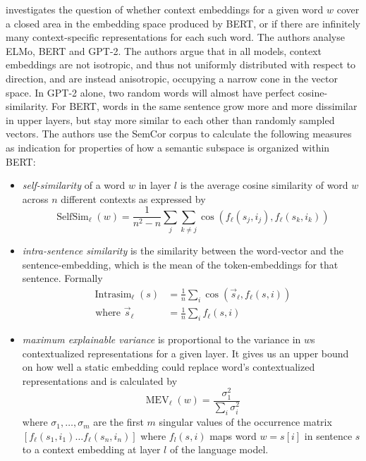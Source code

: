 \documentclass[a4paper,12pt,twoside,openright]{report}
\begin{document}
\cite{ethayarajh19} investigates the question of whether context embeddings for a given word $w$ cover a closed area in the embedding space produced by BERT, or if there are infinitely many context-specific representations for each such word.
The authors analyse ELMo, BERT and GPT-2.
The authors argue that in all models, context embeddings are not isotropic, and thus not uniformly distributed with respect to direction, and are instead anisotropic, occupying a narrow cone in the vector space.
In GPT-2 alone, two random words will almost have perfect cosine-similarity.
For BERT, words in the same sentence grow more and more dissimilar in upper layers, but stay more similar to each other than randomly sampled vectors.
The authors use the SemCor corpus to calculate the following measures as indication for properties of how a semantic subspace is organized within BERT: \\

\begin{itemize}
\item \textit{self-similarity} of a word $w$ in layer $l$ is the average cosine similarity of word $w$ across $n$ different contexts as expressed by 
$$
\operatorname{SelfSim}_{\ell}(w)=\frac{1}{n^{2}-n} \sum_{j} \sum_{k \neq j} \cos \left(f_{\ell}\left(s_{j}, i_{j}\right), f_{\ell}\left(s_{k}, i_{k}\right)\right)
$$
\item \textit{intra-sentence similarity} is the similarity between the word-vector and the sentence-embedding, which is the mean of the token-embeddings for that sentence. 
Formally
$$
\begin{aligned} \operatorname{Intrasim}_{\ell}(s) &=\frac{1}{n} \sum_{i} \cos \left(\vec{s}_{\ell}, f_{\ell}(s, i)\right) \\ \text { where } \vec{s}_{\ell} &=\frac{1}{n} \sum_{i} f_{\ell}(s, i) \end{aligned}
$$
\item \textit{maximum explainable variance} is proportional to the variance in $w$s contextualized representations for a given layer.
It gives us an upper bound on how well a static embedding could replace word's contextualized representations and is calculated by 
$$
\operatorname{MEV}_{\ell}(w)=\frac{\sigma_{1}^{2}}{\sum_{i} \sigma_{i}^{2}}
$$
where $\sigma_1, \ldots, \sigma_m$ are the first $m$ singular values of the occurrence matrix $
\left[f_{\ell}\left(s_{1}, i_{1}\right) \ldots f_{\ell}\left(s_{n}, i_{n}\right)\right]
$ where $f_l(s, i)$ maps word $w = s[i]$ in sentence $s$ to a context embedding at layer $l$ of the language model.
\end{itemize}
\end{document}
